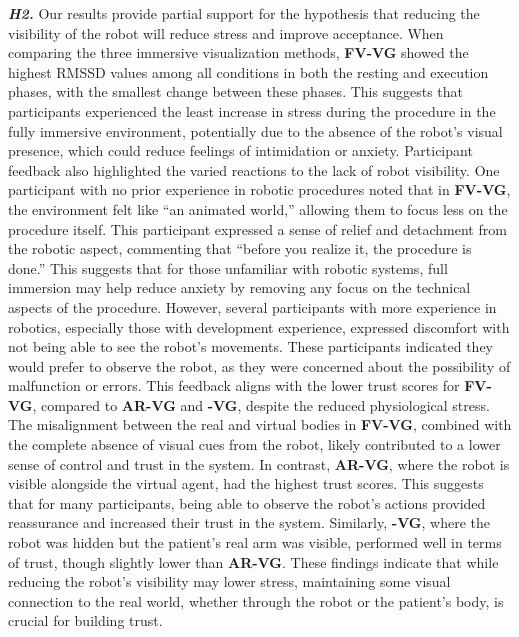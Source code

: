\textbf{\textit{H2.}} Our results provide partial support for the hypothesis that reducing the visibility of the robot will reduce stress and improve acceptance. When comparing the three immersive visualization methods, \textbf{FV-VG} showed the highest RMSSD values among all conditions in both the resting and execution phases, with the smallest change between these phases. This suggests that participants experienced the least increase in stress during the procedure in the fully immersive environment, potentially due to the absence of the robot’s visual presence, which could reduce feelings of intimidation or anxiety. 
Participant feedback also highlighted the varied reactions to the lack of robot visibility. One participant with no prior experience in robotic procedures noted that in \textbf{FV-VG}, the environment felt like “an animated world,” allowing them to focus less on the procedure itself. This participant expressed a sense of relief and detachment from the robotic aspect, commenting that “before you realize it, the procedure is done.” This suggests that for those unfamiliar with robotic systems, full immersion may help reduce anxiety by removing any focus on the technical aspects of the procedure.
However, several participants with more experience in robotics, especially those with development experience, expressed discomfort with not being able to see the robot’s movements. These participants indicated they would prefer to observe the robot, as they were concerned about the possibility of malfunction or errors. This feedback aligns with the lower trust scores for \textbf{FV-VG}, compared to \textbf{AR-VG} and \textbf{-VG}, despite the reduced physiological stress. The misalignment between the real and virtual bodies in \textbf{FV-VG}, combined with the complete absence of visual cues from the robot, likely contributed to a lower sense of control and trust in the system.
In contrast, \textbf{AR-VG}, where the robot is visible alongside the virtual agent, had the highest trust scores. This suggests that for many participants, being able to observe the robot’s actions provided reassurance and increased their trust in the system. Similarly, \textbf{-VG}, where the robot was hidden but the patient’s real arm was visible, performed well in terms of trust, though slightly lower than \textbf{AR-VG}. These findings indicate that while reducing the robot’s visibility may lower stress, maintaining some visual connection to the real world, whether through the robot or the patient’s body, is crucial for building trust.

